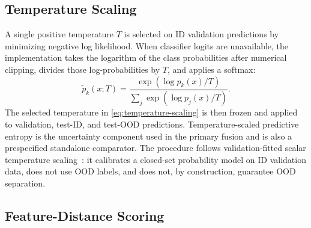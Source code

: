 \subsection{Temperature Scaling}

A single positive temperature \(T\) is selected on ID validation predictions by minimizing negative log likelihood. When classifier logits are unavailable, the implementation takes the logarithm of the class probabilities after numerical clipping, divides those log-probabilities by \(T\), and applies a softmax:
\begin{equation}
  \widetilde{p}_k(x;T)
  = \frac{\exp\!\left(\log p_k(x)/T\right)}
  {\sum_j \exp\!\left(\log p_j(x)/T\right)}.
  \label{eq:temperature-scaling}
\end{equation}
The selected temperature in \eqref{eq:temperature-scaling} is then frozen and applied to validation, test-ID, and test-OOD predictions. Temperature-scaled predictive entropy is the uncertainty component used in the primary fusion and is also a prespecified standalone comparator. The procedure follows validation-fitted scalar temperature scaling~\cite{guo2017calibration}: it calibrates a closed-set probability model on ID validation data, does not use OOD labels, and does not, by construction, guarantee OOD separation.

\subsection{Feature-Distance Scoring}

